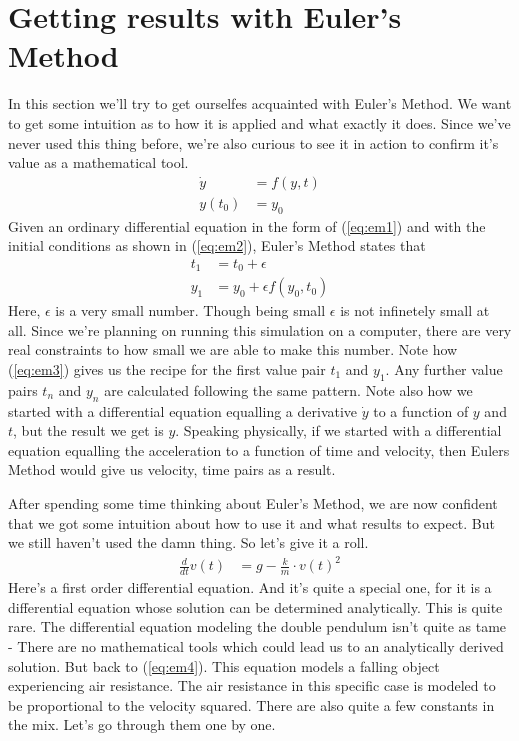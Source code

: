 \documentclass[paper=a4, fontsize=11pt]{scrartcl} %
\numberwithin{equation}{section} %
\numberwithin{figure}{section} %
\numberwithin{table}{section} %
\begin{document}
\section{Getting results with Euler's Method}
In this section we'll try to get ourselfes acquainted with Euler's Method.
We want to get some intuition as to how it is applied and what exactly it does.
Since we've never used this thing before, we're also curious to see it in action to confirm it's value as a mathematical tool.
\begin{align} 
  \dot{y} &= f(y, t) \label{eq:em1} \\
  y(t_0) &= y_0 \label{eq:em2}
\end{align}
Given an ordinary differential equation in the form of (\ref{eq:em1}) and with the initial conditions as shown in (\ref{eq:em2}), Euler's Method states that
\begin{align} \label{eq:em3}
  t_1 &= t_0 + \epsilon \\
  y_1 &= y_0 + \epsilon f(y_0, t_0)
\end{align}
Here, $\epsilon$ is a very small number. Though being small $\epsilon$ is not infinetely small at all.
Since we're planning on running this simulation on a computer, there are very real constraints to how small we are able to make this number.
Note how (\ref{eq:em3}) gives us the recipe for the first value pair $t_1$ and $y_1$. Any further value pairs $t_n$ and $y_n$ are calculated following the same pattern.
Note also how we started with a differential equation equalling a derivative $\dot{y}$ to a function of $y$ and $t$, but the result we get is $y$. Speaking physically,
if we started with a differential equation equalling the acceleration to a function of time and velocity, then Eulers Method would give us velocity, time pairs as a result.
\vspace{\baselineskip}

After spending some time thinking about Euler's Method, we are now confident that we got some intuition about how to use it and what results
to expect. But we still haven't used the damn thing. So let's give it a roll.
\begin{align} \label{eq:em4}
\frac{d}{dt} v(t) &= g - \frac{k}{m} \cdot v(t)^2
\end{align}
Here's a first order differential equation. 
And it's quite a special one, for it is a differential equation whose solution can be determined analytically. This is quite rare.
The differential equation modeling the double pendulum isn't quite as tame - There are no mathematical tools which could lead us to an analytically derived solution. 
But back to (\ref{eq:em4}). This equation models a falling object experiencing air resistance. The air resistance in this specific case is modeled to be proportional 
to the velocity squared. There are also quite a few constants in the mix. Let's go through them one by one.
\end{document}
